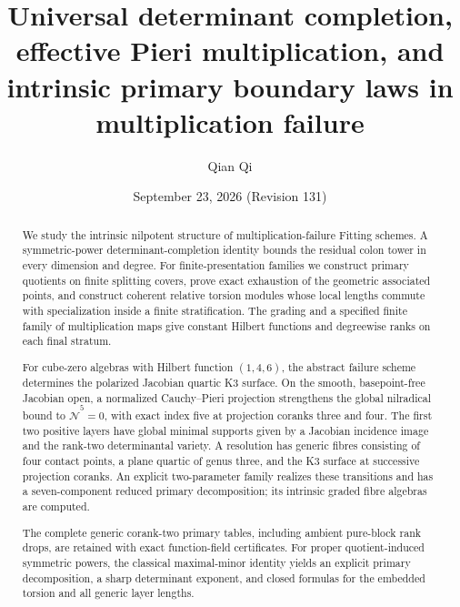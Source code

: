 \title[Determinant completion and primary boundary laws]{Universal determinant completion, effective Pieri multiplication, and intrinsic primary boundary laws in multiplication failure}
\author{Qian Qi}
\date{September 23, 2026 \quad (Revision 131)}
\begin{abstract}
We study the intrinsic nilpotent structure of multiplication-failure
Fitting schemes.  A symmetric-power determinant-completion identity
bounds the residual colon tower in every dimension and degree.  For
finite-presentation families we construct primary quotients on finite
splitting covers, prove exact exhaustion of the geometric associated
points, and construct coherent relative torsion modules whose local
lengths commute with specialization inside a finite stratification.
The grading and a specified finite family of multiplication maps give
constant Hilbert functions and degreewise ranks on each final stratum.

For cube-zero algebras with Hilbert function \((1,4,6)\), the abstract
failure scheme determines the polarized Jacobian quartic K3 surface.
On the smooth, basepoint-free Jacobian open, a normalized Cauchy--Pieri
projection strengthens the global nilradical bound to
\(\widehat{\mathcal N}^{5}=0\), with exact index five at projection
coranks three and four.  The first two positive layers have global
minimal supports given by a Jacobian incidence image and the rank-two
determinantal variety.  A resolution has generic fibres consisting of
four contact points, a plane quartic of genus three, and the K3 surface
at successive projection coranks.  An explicit two-parameter family
realizes these transitions and has a seven-component reduced primary
decomposition; its intrinsic graded fibre algebras are computed.

The complete generic corank-two primary tables, including ambient
pure-block rank drops, are retained with exact function-field
certificates.  For proper quotient-induced symmetric powers, the
classical maximal-minor identity yields an explicit primary
decomposition, a sharp determinant exponent, and closed formulas for
the embedded torsion and all generic layer lengths.
\end{abstract}
\maketitle

